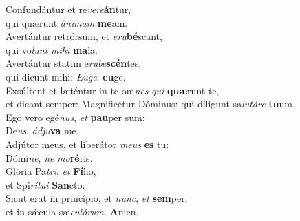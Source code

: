 \evenverse Confundántur et re\textit{ve}\textit{re}\textbf{án}tur,~\*\\
\evenverse qui quærunt \textit{á}\textit{ni}\textit{mam} \textbf{me}am.\\
\oddverse Avertántur retrórsum, et \textit{e}\textit{ru}\textbf{bé}scant,~\*\\
\oddverse qui vo\textit{lunt} \textit{mi}\textit{hi} \textbf{ma}la.\\
\evenverse Avertántur statim e\textit{ru}\textit{be}\textbf{scén}tes,~\*\\
\evenverse qui dicunt mihi: \textit{E}\textit{u}\textit{ge}, \textbf{e}\textbf{u}ge.\\
\oddverse Exsúltent et læténtur in te om\textit{nes} \textit{qui} \textbf{quæ}runt te,~\*\\
\oddverse et dicant semper: Magnificétur Dóminus: qui díligunt sa\textit{lu}\textit{tá}\textit{re} \textbf{tu}um.\\
\evenverse Ego vero egé\textit{nus}, \textit{et} \textbf{pau}per sum:~\*\\
\evenverse De\textit{us}, \textit{ád}\textit{ju}\textbf{va} me.\\
\oddverse Adjútor meus, et liberátor \textit{me}\textit{us} \textbf{es} tu:~\*\\
\oddverse Dómi\textit{ne}, \textit{ne} \textit{mo}\textbf{ré}ris.\\
\evenverse Glória Pa\textit{tri}, \textit{et} \textbf{Fí}lio,~\*\\
\evenverse et Spi\textit{rí}\textit{tu}\textit{i} \textbf{San}cto.\\
\oddverse Sicut erat in princípio, et \textit{nunc}, \textit{et} \textbf{sem}per,~\*\\
\oddverse et in sǽcula sæ\textit{cu}\textit{ló}\textit{rum}. \textbf{A}men.\\
